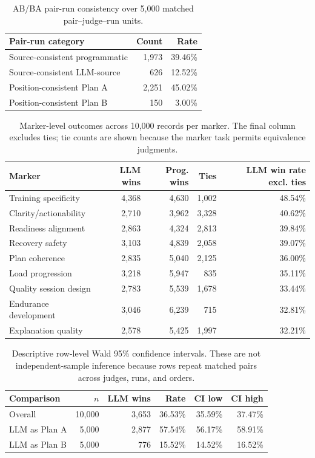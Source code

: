 \documentclass[11pt]{article}
\begin{document}
\begin{table}[h]
\centering
\small
\begin{tabular}{lrr}
\toprule
Pair-run category & Count & Rate \\
\midrule
Source-consistent programmatic & 1,973 & 39.46\% \\
Source-consistent LLM-source & 626 & 12.52\% \\
Position-consistent Plan A & 2,251 & 45.02\% \\
Position-consistent Plan B & 150 & 3.00\% \\
\bottomrule
\end{tabular}
\caption{AB/BA pair-run consistency over 5,000 matched pair--judge--run units.}
\label{tab:pair-run-app}
\end{table}

\begin{table}[h]
\centering
\small
\begin{tabular}{lrrrr}
\toprule
Marker & LLM wins & Prog. wins & Ties & LLM win rate excl. ties \\
\midrule
Training specificity & 4,368 & 4,630 & 1,002 & 48.54\% \\
Clarity/actionability & 2,710 & 3,962 & 3,328 & 40.62\% \\
Readiness alignment & 2,863 & 4,324 & 2,813 & 39.84\% \\
Recovery safety & 3,103 & 4,839 & 2,058 & 39.07\% \\
Plan coherence & 2,835 & 5,040 & 2,125 & 36.00\% \\
Load progression & 3,218 & 5,947 & 835 & 35.11\% \\
Quality session design & 2,783 & 5,539 & 1,678 & 33.44\% \\
Endurance development & 3,046 & 6,239 & 715 & 32.81\% \\
Explanation quality & 2,578 & 5,425 & 1,997 & 32.21\% \\
\bottomrule
\end{tabular}
\caption{Marker-level outcomes across 10,000 records per marker. The final column excludes ties; tie counts are shown because the marker task permits equivalence judgments.}
\label{tab:markers-app}
\end{table}

\begin{table}[h]
\centering
\small
\begin{tabular}{lrrrrr}
\toprule
Comparison & $n$ & LLM wins & Rate & CI low & CI high \\
\midrule
Overall & 10,000 & 3,653 & 36.53\% & 35.59\% & 37.47\% \\
LLM as Plan A & 5,000 & 2,877 & 57.54\% & 56.17\% & 58.91\% \\
LLM as Plan B & 5,000 & 776 & 15.52\% & 14.52\% & 16.52\% \\
\bottomrule
\end{tabular}
\caption{Descriptive row-level Wald 95\% confidence intervals. These are not independent-sample inference because rows repeat matched pairs across judges, runs, and orders.}
\label{tab:uncertainty-app}
\end{table}
\end{document}

